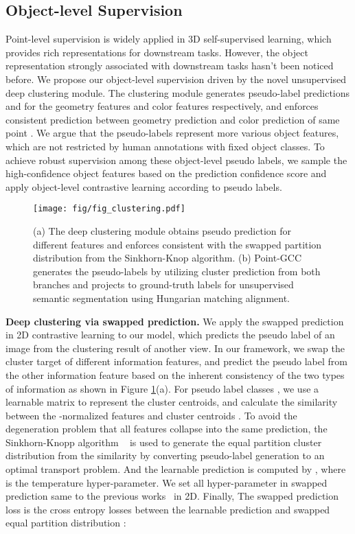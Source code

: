 \documentclass{article}
\begin{document}
\subsection{Object-level Supervision}
\label{sec:object-level}
\vspace{-0.25cm}
Point-level supervision is widely applied in 3D self-supervised learning, which provides rich representations for downstream tasks. However, the object representation strongly associated with downstream tasks hasn't been noticed before. We propose our object-level supervision driven by the novel unsupervised deep clustering module. The clustering module generates pseudo-label predictions  and  for the geometry features  and color features  respectively, and enforces consistent prediction between geometry prediction  and color prediction  of same point . 
We argue that the pseudo-labels represent more various object features, which are not restricted by human annotations with fixed object classes. To achieve robust supervision among these object-level pseudo labels, we sample the high-confidence object features based on the prediction confidence score and apply object-level contrastive learning according to pseudo labels.
\begin{figure}
  \centering
  \texttt{[image: fig/fig\_clustering.pdf]}
  \caption{(a) The deep clustering module obtains pseudo prediction for different features and enforces consistent with the swapped partition distribution from the Sinkhorn-Knop algorithm. (b) Point-GCC generates the pseudo-labels by utilizing cluster prediction from both branches and projects to ground-truth labels for unsupervised semantic segmentation using Hungarian matching alignment.}
\label{fig:adapt}
\vspace{-5pt}
\end{figure} 
\textbf{Deep clustering via swapped prediction.} We apply the swapped prediction~\cite{SWAV} in 2D contrastive learning to our model, which predicts the pseudo label of an image from the clustering result of another view. In our framework, we swap the cluster target of different information features, and predict the pseudo label from the other information feature based on the inherent consistency of the two types of information as shown in Figure \ref{fig:adapt}(a). For pseudo label classes , we use a learnable matrix  to represent the cluster centroids, and calculate the similarity  between the -normalized features  and cluster centroids .
To avoid the degeneration problem that all features collapse into the same prediction, the Sinkhorn-Knopp algorithm ~\cite{Sinkhorn} is used to generate the equal partition cluster distribution  from the similarity  by converting pseudo-label generation to an optimal transport problem. And the learnable prediction  is computed by , where  is the temperature hyper-parameter. We set all hyper-parameter in swapped prediction same to the previous works~\cite{SWAV} in 2D. Finally, The swapped prediction loss is the cross entropy losses between the learnable prediction  and swapped equal partition distribution :
\end{document}
